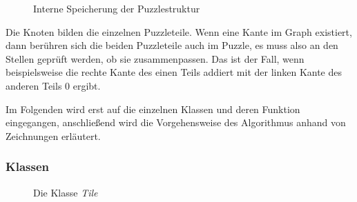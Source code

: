 \documentclass[a4paper, 12pt]{scrartcl}
\begin{document}
\begin{figure}[h]
\begin{subfigure}[t]{0.45\textwidth}

        \label{Graph1.1}
    \end{subfigure}
    \caption{Interne Speicherung der Puzzlestruktur}
    \label{Graph1}
\end{figure}

Die Knoten bilden die einzelnen Puzzleteile. Wenn eine Kante im Graph existiert, dann berühren sich die beiden Puzzleteile auch im Puzzle, es muss also an den Stellen geprüft werden, ob sie zusammenpassen. Das ist der Fall, wenn beispielsweise die rechte Kante des einen Teils addiert mit der linken Kante des anderen Teils 0 ergibt.

Im Folgenden wird erst auf die einzelnen Klassen und deren Funktion eingegangen, anschließend wird die Vorgehensweise des Algorithmus anhand von Zeichnungen erläutert.

\subsubsection{Klassen}
\begin{figure}[h]
    \centering
    \caption{Die Klasse \emph{Tile}}
    \label{tile}
\end{figure}
\end{document}
